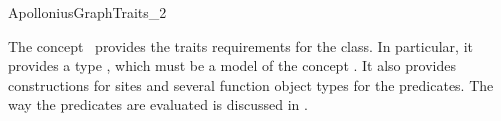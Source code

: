 

\begin{ccRefConcept}{ApolloniusGraphTraits_2}

\ccDefinition
  
The concept \ccRefName\ provides the traits requirements for the
 class. In particular,
it provides a type , which must be a model of the concept
. It also provides
constructions for sites and several function object
types for the predicates. The way the predicates are evaluated is
discussed in \cite{ke-ppawv-02,ke-rctac-03}.



\end{ccRefConcept}
